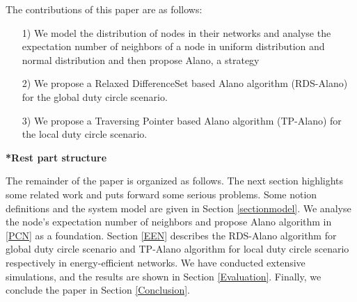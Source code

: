 





The contributions of this paper are as follows:
\begin{itemize}
\item[1)] We model the distribution of nodes in their networks and analyse the 
expectation number of neighbors of a node in uniform distribution and normal
distribution and then propose Alano, a strategy
\item[2)] We propose a Relaxed DifferenceSet based Alano algorithm (RDS-Alano) 
for the global duty circle scenario. 
\item[3)] We propose a Traversing Pointer based Alano algorithm (TP-Alano) 
for the local duty circle scenario. 
\end{itemize}

\textbf{*Rest part structure}

The remainder of the paper is organized as follows.
The next section highlights some related work and 
puts forward some serious problems. 
Some notion definitions and the system model are given in Section
\ref{sectionmodel}. 
We analyse the node's expectation number of neighbors and 
propose Alano algorithm in \ref{PCN} as a foundation.
Section \ref{EEN} describes the RDS-Alano algorithm for global
duty circle scenario and TP-Alano algorithm for local duty circle scenario
respectively in energy-efficient networks.
We have conducted extensive simulations, and the results are shown in Section
\ref{Evaluation}. Finally, we conclude the paper in Section
\ref{Conclusion}.


